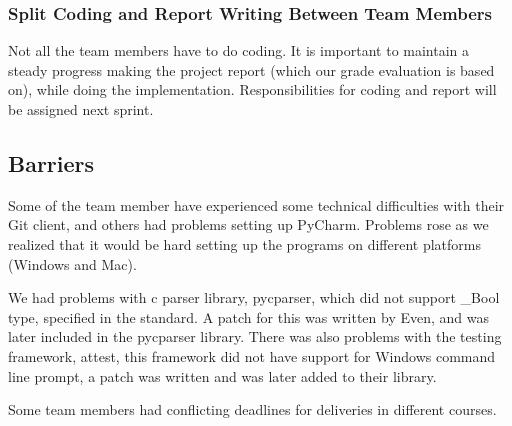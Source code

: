 \subsubsection{Split Coding and Report Writing Between Team Members} 
Not all the team members have to do coding. It is important to maintain a
steady progress making the project report (which our grade evaluation is based
on), while doing the implementation. Responsibilities for coding and report
will be assigned next sprint. 

\subsection{Barriers}
Some of the team member have experienced some technical difficulties with their
Git client, and others had problems setting up PyCharm. Problems rose as we
realized that it would be hard setting up the programs on different
platforms (Windows and Mac).

We had problems with \Gls{c} \gls{parser} \gls{library}, \gls{pycparser}, which did not support \_Bool
type, specified in the  standard. A patch for this was written by Even, and
was later included in the \gls{pycparser} \gls{library}. There was also problems with the
testing framework, attest, this framework did not have support for Windows
command line prompt, a patch was written and was later added to their \gls{library}.

Some team members had conflicting deadlines for deliveries in different courses.

